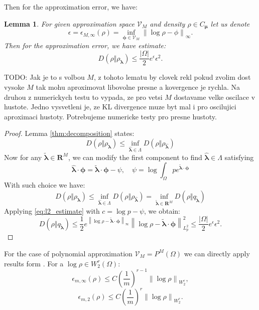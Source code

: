 \documentclass{article}
\newtheorem{lemma}[theorem]{Lemma}
\def\vc#1{\mathbf{\boldsymbol{#1}}}     %
\newcommand{\norm}[1]{\left\lVert#1\right\rVert}
\def\todo#1{{\color{red}TODO: #1}}
\def\R{\mathbf{R}}
\def\abs#1{|#1|}
\def\vl{{\vc\lambda}}
\def\estvl{{\vc{\hat\lambda}}}
\def\vmu{\vc\mu}
\def\vphi{\vc\phi}
\begin{document}
Then for the approximation error, we have:
\begin{lemma}
\label{thm:approx_error}
For given approximation space $\mathcal V_M$ and density $\rho\in C_{\vmu}$ let us denote
\[
  \epsilon = \epsilon_{M,\infty}(\rho) = \inf_{\vphi \in \mathcal V_M} \norm{\log \rho - \phi}_\infty.
\]
Then for the approximation error, we have estimate:
\[
D(\rho\Vert\rho_{\vl})  \le \frac{\abs{\Omega}}{2} e^{\epsilon} \epsilon^2.
\]
\end{lemma}
\todo{Jak je to s volbou $M$, z tohoto lematu by clovek rekl pokud zvolim dost vysoke $M$ tak mohu aproximovat libovolne presne a kovergence je rychla. Na druhou z numerickych testu to vypada, ze pro vetsi $M$ dostavame velke oscilace v hustote. Jedno vysvetleni je, ze KL divergence muze byt mal i pro oscilujici aproximaci hustoty. Potrebujeme numericke testy pro presne hustoty.} 
\begin{proof}
Lemma \ref{thm:decomposition} states:
\[
D(\rho\Vert\rho_{\vl}) \le \inf_{\estvl \in \Lambda} D(\rho\Vert\rho_{\estvl})
\]
Now for any $\vc{\tilde\lambda} \in \R^M$, we can modify the first component to find $\estvl \in \Lambda$ satisfying
\[
  \estvl \cdot \vphi = \vc{\tilde\lambda} \cdot \vphi - \psi, \quad \psi 
                             = \log \int_\Omega p e^{\widetilde{\vc\lambda}\cdot \vc \phi}
\]
With such choice we have:
\[
D(\rho\Vert\rho_{\vl}) \le \inf_{\estvl \in \Lambda} D(\rho\Vert\rho_{\estvl})
=\inf_{\vc{\tilde\lambda} \in \R^M} D(\rho\Vert q_{\vc{\tilde\lambda}})
\]
Applying \eqref{eq:l2_estimate} with $c = \log p - \psi$, we obtain:
\[
  D(\rho\Vert q_{\vc{\tilde\lambda}}) \le 
  \frac{1}{2}
  e^{\norm{\log \rho - \vc{\tilde\lambda}\cdot \vc \phi}_\infty} 
    \norm{\log \rho - \vc{\tilde\lambda}\cdot \vc \phi}_{L^2_p}^2
  \le \frac{\abs{\Omega}}{2} e^{\epsilon} \epsilon^2.
\]
\end{proof}
For the case of polynomial approximation $\mathcal V_M = P^M(\Omega)$ we can directly apply results form \cite[Section 7]{Barron1991}. For a $\log\rho \in W^r_2(\Omega)$:
\[
    \epsilon_{m,\infty}(\rho) \le C \left(\frac{1}{m}\right)^{r-1} \norm{\log\rho}_{W^r_2},
\]
\[
    \epsilon_{m,2}(\rho) \le C \left(\frac{1}{m}\right)^{r}\norm{\log\rho}_{W^r_2}.
\]
\end{document}
